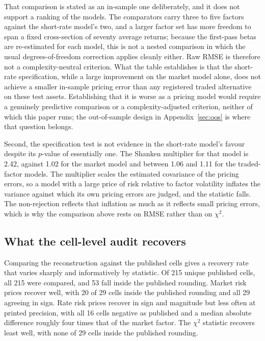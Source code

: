 \documentclass[11pt]{article}
\begin{document}
That comparison is stated as an in-sample one deliberately, and it does not
support a ranking of the models. The comparators carry three to five factors
against the short-rate model's two, and a larger factor set has more freedom to
span a fixed cross-section of seventy average returns; because the first-pass
betas are re-estimated for each model, this is not a nested comparison in which
the usual degrees-of-freedom correction applies cleanly either. Raw RMSE is
therefore not a complexity-neutral criterion. What the table establishes is that
the short-rate specification, while a large improvement on the market model
alone, does not achieve a smaller in-sample pricing error than any registered
traded alternative on these test assets. Establishing that it is worse as a
pricing model would require a genuinely predictive comparison or a
complexity-adjusted criterion, neither of which this paper runs; the
out-of-sample design in Appendix~\ref{sec:oos} is where that question belongs.

Second, the specification test is not evidence in the short-rate model's favour
despite its $p$-value of essentially one. The Shanken multiplier for that model
is 2.42, against 1.02 for the market model and between 1.06 and 1.11 for the %
traded-factor models. %
The multiplier scales the estimated covariance of the pricing errors, so a model
with a large price of risk relative to factor volatility inflates the variance
against which its own pricing errors are judged, and the statistic falls. The
non-rejection reflects that inflation as much as it reflects small pricing
errors, which is why the comparison above rests on RMSE rather than on $\chi^2$. %

\subsection{What the cell-level audit recovers}

Comparing the reconstruction against the published cells gives a recovery rate
that varies sharply and informatively by statistic. Of 215 unique published cells, %
all 215 were compared, and 53 fall inside the published rounding. %
Market risk prices recover well, with 20 of 29 cells inside the published %
rounding and all 29 agreeing in sign. Rate risk prices recover in sign and %
magnitude but less often at printed precision, with all 16 cells negative as %
published and a median absolute difference roughly four times that of the market
factor. The $\chi^2$ statistic recovers least well, with none of 29 cells inside %
the published rounding. %
\end{document}
